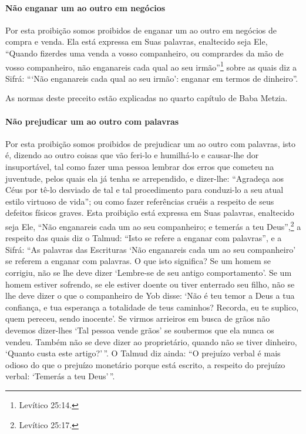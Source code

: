 \paragraph{Não enganar um ao outro em negócios}

Por esta proibição somos proibidos de enganar um ao outro em negócios
de compra e venda. Ela está expressa em Suas palavras, enaltecido seja
Ele, ``Quando fizerdes uma venda a vosso companheiro, ou comprardes da
mão de vosso companheiro, não enganareis cada qual ao seu irmão''\footnote{Levítico
25:14.} sobre as quais diz a Sifrá: ```Não enganareis cada qual ao seu
irmão': enganar em termos de dinheiro''.

As normas deste preceito estão explicadas no quarto capítulo de Baba Metzia.

\paragraph{Não prejudicar um ao outro com palavras}

Por esta proibição somos proibidos de prejudicar um ao outro com
palavras, isto é, dizendo ao outro coisas que vão feri-lo e humilhá-lo e
causar-lhe dor insuportável, tal como fazer uma pessoa lembrar dos erros
que cometeu na juventude, pelos quais ela já tenha se arrependido, e
dizer-lhe: ``Agradeça aos Céus por tê-lo desviado de tal e tal
procedimento para conduzi-lo a seu atual estilo virtuoso de vida''; ou
como fazer referências cruéis a respeito de seus defeitos físicos
graves. Esta proibição está expressa em Suas palavras, enaltecido seja
Ele, ``Não enganareis cada um ao seu companheiro; e temerás a teu Deus'',\footnote{Levítico 25:17.} a respeito das quais diz o Talmud: ``Isto se refere a
enganar com palavras'', e a Sifrá: ``As palavras das Escrituras `Não
enganareis cada um ao seu companheiro' se referem a enganar com
palavras. O que isto significa? Se um homem se corrigiu, não se lhe
deve dizer `Lembre-se de seu antigo comportamento'. Se um homem estiver
sofrendo, se ele estiver doente ou tiver enterrado seu filho, não se
lhe deve dizer o que o companheiro de Yob disse: `Não é teu temor a Deus
a tua confiança, e tua esperança a totalidade de teus caminhos? Recorda,
eu te suplico, quem pereceu, sendo inocente'. Se virmos arrieiros em
busca de grãos não devemos dizer-lhes `Tal pessoa vende grãos' se
soubermos que ela nunca os vendeu. Também não se deve dizer ao
proprietário, quando não se tiver dinheiro, `Quanto custa este
artigo?'\,''. O Talmud diz ainda: ``O prejuízo verbal é mais odioso do que
o prejuízo monetário porque está escrito, a respeito do prejuízo
verbal: `Temerás a teu Deus'\,''.

